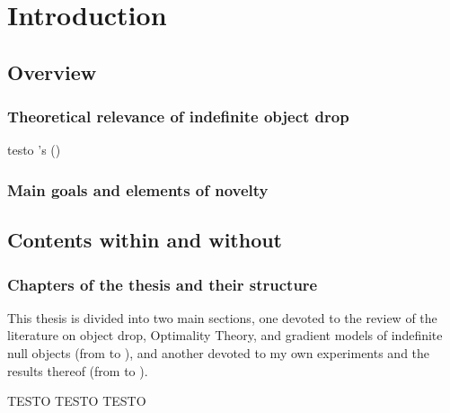 \setchapterpreamble[u]{\margintoc}
\chapter{Introduction}

\section{Overview} 

\subsection{Theoretical relevance of indefinite object drop}
testo \citeauthor{CappelliLenciPISA}'s (\citeyear{CappelliLenciPISA})

\subsection{Main goals and elements of novelty}


\section{Contents within and without} 

\subsection{Chapters of the thesis and their structure}
This thesis is divided into two main sections, one devoted to the review of the literature on object drop, Optimality Theory, and gradient models of indefinite null objects (from  to ), and another devoted to my own experiments and the results thereof (from  to ).

TESTO TESTO TESTO

